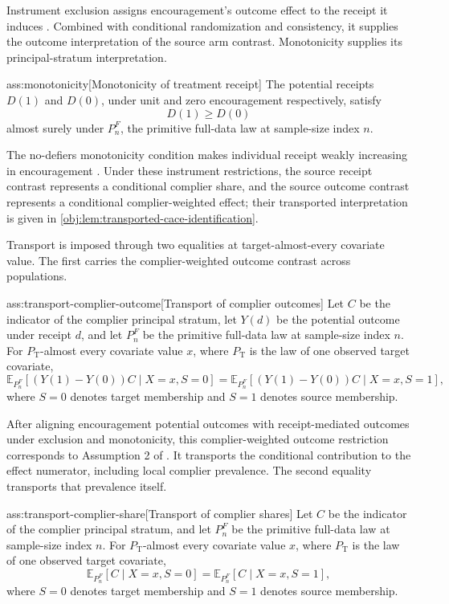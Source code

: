 \documentclass[11pt]{article}
\begin{document}
Instrument exclusion assigns encouragement's outcome effect to the receipt it induces \citep{ChenHuang2025Generalizing}. Combined with conditional randomization and consistency, it supplies the outcome interpretation of the source arm contrast. Monotonicity supplies its principal-stratum interpretation.

\begin{assumptionv}{ass:monotonicity}[Monotonicity of treatment receipt]
The potential receipts \(D(1)\) and \(D(0)\), under unit and zero encouragement respectively, satisfy
\[
D(1)\ge D(0)
\]
almost surely under \(P_n^F\), the primitive full-data law at sample-size index \(n\).
\end{assumptionv}

The no-defiers monotonicity condition makes individual receipt weakly increasing in encouragement \citep{ChenHuang2025Generalizing}. Under these instrument restrictions, the source receipt contrast represents a conditional complier share, and the source outcome contrast represents a conditional complier-weighted effect; their transported interpretation is given in \cref{obj:lem:transported-cace-identification}.

Transport is imposed through two equalities at target-almost-every covariate value. The first carries the complier-weighted outcome contrast across populations.

\begin{assumptionv}{ass:transport-complier-outcome}[Transport of complier outcomes]
Let \(C\) be the indicator of the complier principal stratum, let \(Y(d)\) be the potential outcome under receipt \(d\), and let \(P_n^F\) be the primitive full-data law at sample-size index \(n\). For \(P_{\mathrm T}\)-almost every covariate value \(x\), where \(P_{\mathrm T}\) is the law of one observed target covariate,
\[
\mathbb E_{P_n^F}[(Y(1)-Y(0))C\mid X=x,S=0]
=
\mathbb E_{P_n^F}[(Y(1)-Y(0))C\mid X=x,S=1],
\]
where \(S=0\) denotes target membership and \(S=1\) denotes source membership.
\end{assumptionv}

After aligning encouragement potential outcomes with receipt-mediated outcomes under exclusion and monotonicity, this complier-weighted outcome restriction corresponds to Assumption 2 of \citet{ChenHuang2025Generalizing}. It transports the conditional contribution to the effect numerator, including local complier prevalence. The second equality transports that prevalence itself.

\begin{assumptionv}{ass:transport-complier-share}[Transport of complier shares]
Let \(C\) be the indicator of the complier principal stratum, and let \(P_n^F\) be the primitive full-data law at sample-size index \(n\). For \(P_{\mathrm T}\)-almost every covariate value \(x\), where \(P_{\mathrm T}\) is the law of one observed target covariate,
\[
\mathbb E_{P_n^F}[C\mid X=x,S=0]
=
\mathbb E_{P_n^F}[C\mid X=x,S=1],
\]
where \(S=0\) denotes target membership and \(S=1\) denotes source membership.
\end{assumptionv}
\end{document}
